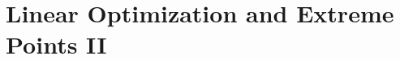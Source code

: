 \documentclass[main]{subfiles}
\begin{document}

\section{Linear Optimization and Extreme Points II}
\end{document}
